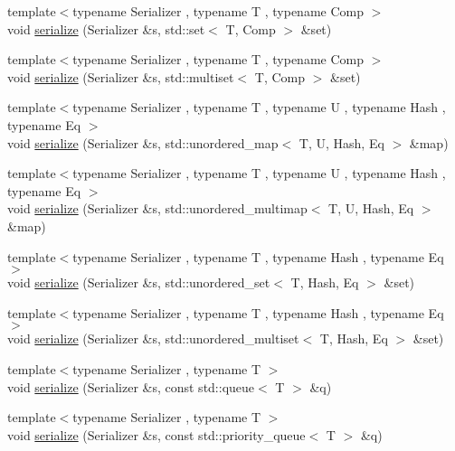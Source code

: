 \begin{DoxyCompactItemize}
\item 
{\footnotesize template$<$typename Serializer , typename T , typename Comp $>$ }\\void \hyperlink{namespacecheckpoint_a9f1869781f4cce4db94c144174680b24}{serialize} (Serializer \&s, std\+::set$<$ T, Comp $>$ \&set)
\item 
{\footnotesize template$<$typename Serializer , typename T , typename Comp $>$ }\\void \hyperlink{namespacecheckpoint_ae032265314cdf8e9155a6bbc423ca1c9}{serialize} (Serializer \&s, std\+::multiset$<$ T, Comp $>$ \&set)
\item 
{\footnotesize template$<$typename Serializer , typename T , typename U , typename Hash , typename Eq $>$ }\\void \hyperlink{namespacecheckpoint_a9fc2f3eb20d3ce8d6145e99a2559ea58}{serialize} (Serializer \&s, std\+::unordered\+\_\+map$<$ T, U, Hash, Eq $>$ \&map)
\item 
{\footnotesize template$<$typename Serializer , typename T , typename U , typename Hash , typename Eq $>$ }\\void \hyperlink{namespacecheckpoint_aa77eeb7a036d253ef33ed2c9ef764a5e}{serialize} (Serializer \&s, std\+::unordered\+\_\+multimap$<$ T, U, Hash, Eq $>$ \&map)
\item 
{\footnotesize template$<$typename Serializer , typename T , typename Hash , typename Eq $>$ }\\void \hyperlink{namespacecheckpoint_ae4ca8cbc6daf2f5a2a20d44d9fe1cc9f}{serialize} (Serializer \&s, std\+::unordered\+\_\+set$<$ T, Hash, Eq $>$ \&set)
\item 
{\footnotesize template$<$typename Serializer , typename T , typename Hash , typename Eq $>$ }\\void \hyperlink{namespacecheckpoint_a64c8a1aa29d469bc71c88a8836264ecc}{serialize} (Serializer \&s, std\+::unordered\+\_\+multiset$<$ T, Hash, Eq $>$ \&set)
\item 
{\footnotesize template$<$typename Serializer , typename T $>$ }\\void \hyperlink{namespacecheckpoint_a5621e2549443d76acad6c83fdfdcbeab}{serialize} (Serializer \&s, const std\+::queue$<$ T $>$ \&q)
\item 
{\footnotesize template$<$typename Serializer , typename T $>$ }\\void \hyperlink{namespacecheckpoint_a9493433bed418b54358130463961ce50}{serialize} (Serializer \&s, const std\+::priority\+\_\+queue$<$ T $>$ \&q)
\item 

\end{DoxyCompactItemize}
